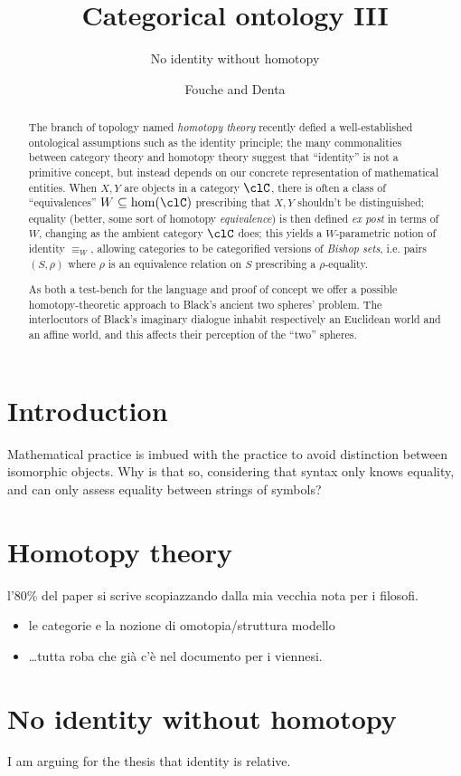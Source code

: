 \documentclass{amsart}
\author{Fouche and Denta}
\title{Categorical ontology III}
\subtitle{No identity without homotopy}
\begin{document}
\maketitle
\begin{abstract}
  The branch of topology named \emph{homotopy theory} recently defied a well\hyp{}established ontological assumptions such as the identity principle; the many commonalities between category theory and homotopy theory suggest that ``identity'' is not a primitive concept, but instead depends on our concrete representation of mathematical entities. When $X,Y$ are objects in a category $\clC$, there is often a class of ``equivalences'' $W \subseteq \hom(\clC)$ prescribing that $X,Y$ shouldn't be distinguished; equality (better, some sort of homotopy \emph{equivalence}) is then defined \emph{ex post} in terms of $W$, changing as the ambient category $\clC$ does; this yields a $W$-parametric notion of identity $\equiv_W$, allowing categories to be categorified versions of \emph{Bishop sets}, i.e. pairs $(S,\rho)$ where $\rho$ is an equivalence relation on $S$ prescribing a $\rho$-equality.

  As both a test-bench for the language and proof of concept we offer a possible homotopy-theoretic approach to Black's ancient two spheres' problem. The interlocutors of Black's imaginary dialogue inhabit respectively an Euclidean world and an affine world, and this affects their perception of the ``two'' spheres.
\end{abstract}
\section{Introduction}
Mathematical practice is imbued with the practice to avoid distinction between isomorphic objects.  Why is that so, considering that syntax only knows equality, and can only assess equality between strings of symbols?
\section{Homotopy theory}
l'80\% del paper si scrive scopiazzando dalla mia vecchia nota per i filosofi.
\begin{itemize}
  \item le categorie e la nozione di omotopia/struttura modello
  \item \dots tutta roba che già c'è nel documento per i viennesi.
\end{itemize}
\section{No identity without homotopy}
\epigraph{I am arguing for the thesis that identity is relative.}{\cite{}}
\end{document}
